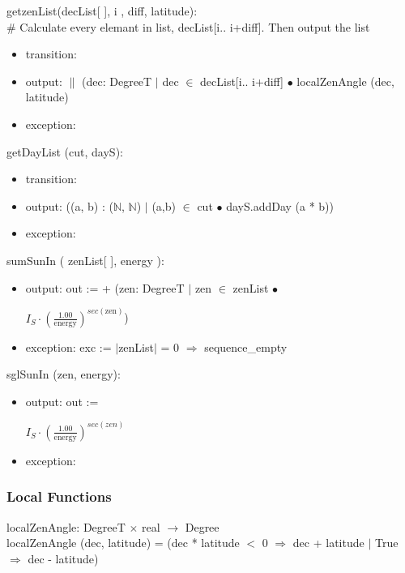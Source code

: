 \documentclass[12pt, titlepage]{article}
\begin{document}
\noindent getzenList(decList[ ], i , diff, latitude):\\
$\#$ Calculate every elemant in list, decList[i.. i+diff]. Then output the list
\begin{itemize}
\item transition: 
\item output: $\|$ (dec: DegreeT $|$ dec $\in$ decList[i.. i+diff] $\bullet$ localZenAngle (dec, latitude)
\item exception: 
\end{itemize}

\noindent getDayList (cut, dayS):\\
\begin{itemize}
\item transition: 
\item output: ((a, b) : ($\mathbb{N}$, $\mathbb{N}$) $|$ (a,b) $\in$ cut $\bullet	$  dayS.addDay (a * b))
\item exception: 
\end{itemize}

\noindent sumSunIn (  zenList[ ], energy ):
\begin{itemize}
\item output: out := + (zen: DegreeT $|$ zen $\in$ zenList $\bullet$ 
\begin{center}\large
$I_{S} \cdot (\frac{1.00}{\text{energy}})^{sec(\text{zen})} $)
\end{center}
\item exception: exc := $|$zenList$|$ = 0 $\Rightarrow$ sequence\_empty
\end{itemize}

\noindent sglSunIn (zen, energy):
\begin{itemize}
\item output: out := 
\begin{center}\large
$I_{S} \cdot (\frac{1.00}{\text{energy}})^{sec(zen)} $
\end{center}
\item exception: 
\end{itemize}


\subsubsection{Local Functions}
localZenAngle: DegreeT $\times$ real $\rightarrow$ Degree\\
localZenAngle (dec, latitude) = (dec * latitude $<$ 0 $\Rightarrow$ dec + latitude $|$ True $\Rightarrow$ dec - latitude)
\end{document}
